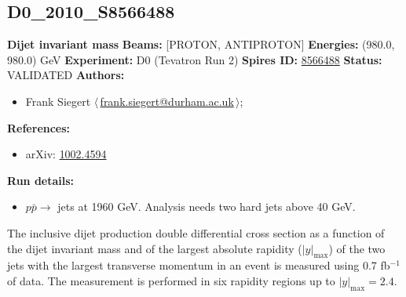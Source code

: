 \subsection[D0\_2010\_S8566488]{D0\_2010\_S8566488\,\cite{Abazov:2010fr}}
\textbf{Dijet invariant mass}\newline
\textbf{Beams:} [PROTON, ANTIPROTON] \newline
\textbf{Energies:} (980.0, 980.0) GeV \newline
\textbf{Experiment:} D0 (Tevatron Run 2) \newline
\textbf{Spires ID:} \href{http://www.slac.stanford.edu/spires/find/hep/www?rawcmd=key+8566488}{8566488}\newline
\textbf{Status:} VALIDATED\newline
\textbf{Authors:}
\begin{itemize}
  \item Frank Siegert $\langle\,$\href{mailto:frank.siegert@durham.ac.uk}{frank.siegert@durham.ac.uk}$\,\rangle$;
\end{itemize}
\textbf{References:}
\begin{itemize}
  \item arXiv: \href{http://arxiv.org/abs/1002.4594}{1002.4594}
\end{itemize}
\textbf{Run details:}
\begin{itemize}

  \item $p \bar{p} \to$ jets at 1960 GeV. Analysis needs two hard jets above 40 GeV.\end{itemize}

\noindent The inclusive dijet production double differential cross section as a function of the dijet invariant mass and of the largest absolute rapidity ($|y|_\text{max}$) of the two jets with the largest transverse momentum in an event is measured using 0.7 fb$^{-1}$ of data. The measurement is performed in six rapidity regions up to $|y|_\text{max}=2.4$.

\clearpage


\clearpage

